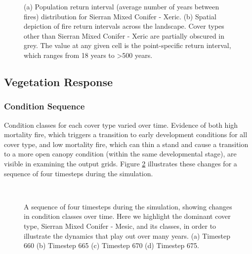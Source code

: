 \begin{figure}[!htbp]
  \centering
  \caption{(a) Population return interval (average number of years between fires) distribution for Sierran Mixed Conifer - Xeric.  (b) Spatial depiction of fire return intervals across the landscape. Cover types other than Sierran Mixed Conifer - Xeric are partially obscured in grey. The value at any given cell is the point-specific return interval, which ranges from 18 years to \textgreater 500 years.}
\label{fig:preturn_smcx}
\end{figure}

\clearpage

\subsection{Vegetation Response}
\label{subsec:HRVvegresponse}

\subsubsection{Condition Sequence}

Condition classes for each cover type varied over time. Evidence of both high mortality fire, which triggers a transition to early development conditions for all cover type, and low mortality fire, which can thin a stand and cause a transition to a more open canopy condition (within the same developmental stage), are visible in examining the output grids. Figure \ref{fig:covcondmaps} illustrates these changes for a sequence of four timesteps during the simulation.

\begin{figure}[!htbp]
  \centering
  \\%
  \caption{A sequence of four timesteps during the simulation, showing changes in condition classes over time. Here we highlight the dominant cover type, Sierran Mixed Conifer - Mesic, and its classes, in order to illustrate the dynamics that play out over many years. (a) Timestep 660 (b) Timestep 665 (c) Timestep 670 (d) Timestep 675.}
  \label{fig:covcondmaps}
\end{figure}

